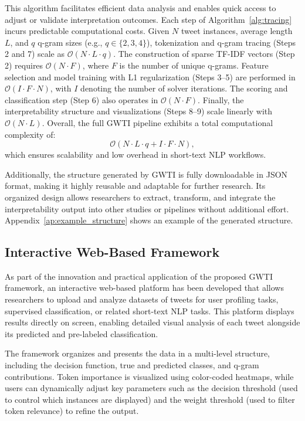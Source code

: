 \documentclass[runningheads,10pt]{llncs}
\begin{document}
This algorithm facilitates efficient data analysis and enables quick access to adjust or validate interpretation outcomes. Each step of Algorithm~\ref{alg:tracing} incurs predictable computational costs. Given $N$ tweet instances, average length $L$, and $q$ q-gram sizes  (e.g., $q \in \{2, 3, 4\}$), tokenization and q-gram tracing (Steps 2 and 7) scale as $\mathcal{O}(N \cdot L \cdot q)$. The construction of sparse TF-IDF vectors (Step 2) requires $\mathcal{O}(N \cdot F)$, where $F$ is the number of unique q-grams. Feature selection and model training with L1 regularization (Steps 3–5) are performed in $\mathcal{O}(I \cdot F \cdot N)$, with $I$ denoting the number of solver iterations. The scoring and classification step (Step 6) also operates in $\mathcal{O}(N \cdot F)$. Finally, the interpretability structure and visualizations (Steps 8–9) scale linearly with $\mathcal{O}(N \cdot L)$. Overall, the full \ac{GWTI} pipeline exhibits a total computational complexity of:
\[
\mathcal{O}(N \cdot L \cdot q + I \cdot F \cdot N),
\]
which ensures scalability and low overhead in short-text \ac{NLP} workflows.

Additionally, the structure generated by \ac{GWTI} is fully downloadable in JSON format, making it highly reusable and adaptable for further research. Its organized design allows researchers to extract, transform, and integrate the interpretability output into other studies or pipelines without additional effort. Appendix~\ref{ap:example_structure} shows an example of the generated structure.

\subsection{Interactive Web-Based Framework}

As part of the innovation and practical application of the proposed \ac{GWTI} framework, an interactive web-based platform has been developed that allows researchers to upload and analyze datasets of tweets for user profiling tasks, supervised classification, or related short-text \ac{NLP} tasks. This platform displays results directly on screen, enabling detailed visual analysis of each tweet alongside its predicted and pre-labeled classification.

The framework organizes and presents the data in a multi-level structure, including the decision function, true and predicted classes, and q-gram contributions. Token importance is visualized using color-coded heatmaps, while users can dynamically adjust key parameters such as the decision threshold (used to control which instances are displayed) and the weight threshold (used to filter token relevance) to refine the output.
\end{document}
